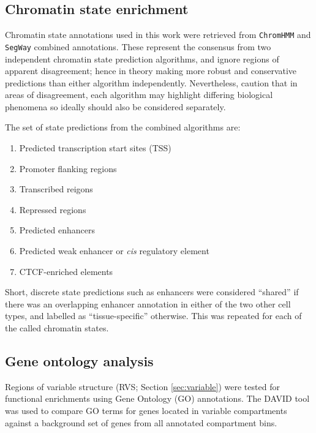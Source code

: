 \documentclass[a4paper,11pt,oneside]{book}
\begin{document}
\subsection{Chromatin state enrichment}\label{enhancer-enrichment}

Chromatin state annotations used in this work were retrieved from \texttt{ChromHMM}\cite{Ernst2011} and \texttt{SegWay}\cite{Hoffman2012} combined annotations.\cite{Hoffman2013} These represent the consensus from two independent chromatin state prediction algorithms, and ignore regions of apparent disagreement; hence in theory making more robust and conservative predictions than either algorithm independently. Nevertheless, \citet{Hoffman2013} caution that in areas of disagreement, each algorithm may highlight differing biological phenomena so ideally should also be considered separately.

The set of state predictions from the combined algorithms are:
\begin{enumerate}
\item Predicted transcription start sites (TSS)
\item Promoter flanking regions
\item Transcribed reigons
\item Repressed regions
\item Predicted enhancers
\item Predicted weak enhancer or \emph{cis} regulatory element
\item CTCF-enriched elements
\end{enumerate}

Short, discrete state predictions such as enhancers were
considered ``shared'' if there was an overlapping enhancer annotation in
either of the two other cell types, and labelled as ``tissue-specific''
otherwise. This was repeated for each of the called chromatin states.

\subsection{Gene ontology analysis}\label{meth:go}

Regions of variable structure (RVS; Section \ref{sec:variable}) were tested for functional enrichments using Gene Ontology (GO) annotations.\cite{Ashburner2000} The DAVID tool\cite{Huang2008} was used to compare GO terms for genes located in variable compartments against a background set of genes from all annotated compartment bins.
\end{document}
